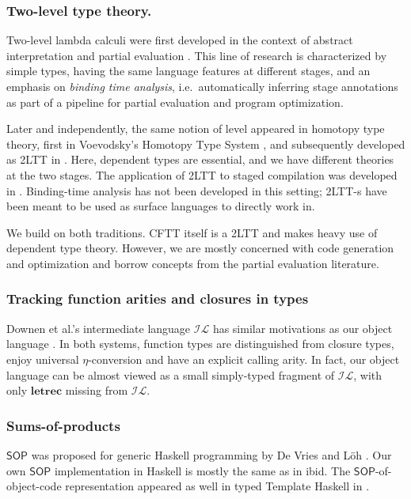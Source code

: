 \documentclass[acmsmall,screen,review,anonymous]{acmart}
\newcommand{\msf}[1]{{\mathsf{#1}}}
\newcommand{\mbf}[1]{{\mathbf{#1}}}
\newcommand{\SOP}{\msf{SOP}}
\theoremstyle{remark}
\begin{document}
\subsubsection*{Two-level type theory.} Two-level lambda calculi were first developed in
the context of abstract interpretation and partial evaluation
\cite{DBLP:phd/ethos/Nielson84a,DBLP:books/daglib/0071307}.  This line of
research is characterized by simple types, having the same language features at
different stages, and an emphasis on \emph{binding time analysis},
i.e.\ automatically inferring stage annotations as part of a pipeline for
partial evaluation and program optimization.

Later and independently, the same notion of level appeared in homotopy type
theory, first in Voevodsky's Homotopy Type System \cite{hts}, and subsequently developed as
2LTT in \cite{twolevel}. Here, dependent types are essential, and we have different
theories at the two stages. The application of 2LTT to staged compilation was
developed in \cite{staged2ltt}. Binding-time analysis has not been developed in this
setting; 2LTT-s have been meant to be used as surface languages to directly work
in.

We build on both traditions. CFTT itself is a 2LTT and makes heavy use of
dependent type theory. However, we are mostly concerned with code generation and
optimization and borrow concepts from the partial evaluation literature.

\subsubsection*{Tracking function arities and closures in types} Downen et al.'s
intermediate language $\mathcal{IL}$ has similar motivations as our object
language \cite{DBLP:journals/pacmpl/DownenAJE20}. In both systems, function
types are distinguished from closure types, enjoy universal $\eta$-conversion
and have an explicit calling arity. In fact, our object language can be almost
viewed as a small simply-typed fragment of $\mathcal{IL}$, with only
$\mbf{letrec}$ missing from $\mathcal{IL}$.

\subsubsection*{Sums-of-products} $\SOP$ was proposed for generic Haskell programming
by De Vries and Löh \cite{DBLP:conf/icfp/VriesL14}. Our own $\SOP$
implementation in Haskell is mostly the same as in ibid. The
$\SOP$-of-object-code representation appeared as well in typed Template Haskell
in \cite{DBLP:conf/haskell/PickeringLW20}.
\end{document}
